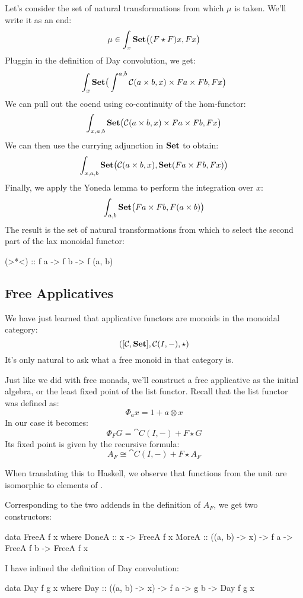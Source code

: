 \documentclass[DaoFP]{subfiles}
\begin{document}
Let's consider the set of natural transformations from which $\mu$ is taken. We'll write it as an end:
\[ \mu \in \int_x \mathbf{Set} \big( (F \star F) x, F x \big) \]
Pluggin in the definition of Day convolution, we get:
\[ \int_x \mathbf{Set} \big( \int^{a, b} \mathcal{C} (a \times b, x) \times F a \times  F b, F x \big) \]
We can pull out the coend using co-continuity of the hom-functor:
\[ \int_{x, a, b} \mathbf{Set} \big( \mathcal{C} (a \times b, x) \times F a \times  F b, F x \big) \]
We can then use the currying adjunction in $\mathbf{Set}$ to obtain:
\[ \int_{x, a, b} \mathbf{Set} \big( \mathcal{C} (a \times b, x),  \mathbf{Set}( F a \times  F b, F x) \big) \]
Finally, we apply the Yoneda lemma to perform the integration over $x$:
\[ \int_{a, b}  \mathbf{Set} \big( F a \times  F b, F (a \times b) \big) \]
The result is the set of natural transformations from which to select the second part of the lax monoidal functor:
\begin{haskell}
  (>*<) :: f a -> f b -> f (a, b)
\end{haskell}

\subsection{Free Applicatives}

We have just learned that applicative functors are monoids in the monoidal category:
\[ ([\mathcal{C}, \mathbf{Set}], \mathcal{C}(I, -), \star) \]
It's only natural to ask what a free monoid in that category is. 

Just like we did with free monads, we'll construct a free applicative as the initial algebra, or the least fixed point of the list functor. Recall that the list functor was defined as:
\[ \Phi_a x = 1 + a \otimes x \]
In our case it becomes:
\[ \Phi_F G = \cat C(I, -) + F \star G \]
Its fixed point is given by the recursive formula:
\[ A_F \cong \cat C(I, -) + F \star A_F\]

When translating this to Haskell, we observe that functions from the unit  are isomorphic to elements of . 

Corresponding to the two addends in the definition of $A_F$, we get two constructors:
\begin{haskell}
data FreeA f x where
  DoneA :: x -> FreeA f x
  MoreA :: ((a, b) -> x) -> f a -> FreeA f b -> FreeA f x
\end{haskell}
I have inlined the definition of Day convolution:
\begin{haskell}
data Day f g x where
  Day :: ((a, b) -> x) -> f a -> g b -> Day f g x
\end{haskell}
\end{document}
